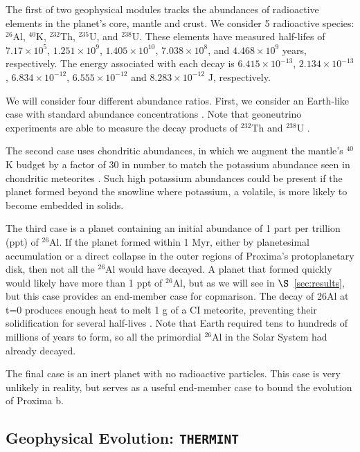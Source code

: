 \documentclass[preprint,12pt]{aastex}
\def\eg{{\it e.g.\ }}
\def\thermint{\texttt{\footnotesize{THERMINT}}\xspace}
\begin{document}
The first of two geophysical modules tracks the abundances of
radioactive elements in the planet's core, mantle and crust. We
consider 5 radioactive species: $^{26}$Al, $^{40}$K, $^{232}$Th,
$^{235}$U, and $^{238}$U. These elements have measured half-lifes of
$7.17 \times 10^5$, $1.251 \times 10^9$, $1.405 \times 10^{10}$,
$7.038 \times 10^8$, and $4.468 \times 10^9$ years, respectively. The
energy associated with each decay is $6.415 \times 10^{-13}$,
$2.134 \times 10^{-13}$, $6.834 \times 10^{-12}$,
$6.555 \times 10^{-12}$ and $8.283 \times 10^{-12}$ J, respectively.

We will consider four different abundance ratios. First, we consider an
Earth-like case with standard abundance concentrations
\citep[\eg][]{Korenaga03,Arevalo09,Huang13}. Note that geoneutrino
experiments are able to measure the decay products of $^{232}$Th and
$^{238}$U \citep{Raghavan98,Araki05,Dye10}.

The second case uses chondritic abundances, in which we augment the
mantle's $^{40}$K budget by a factor of 30 in number to match the
potassium abundance seen in chondritic meteorites
\citep{AndersGrevesse89,Arevalo09}. Such high potassium abundances could be
present if the planet formed beyond the snowline where potassium, a
volatile, is more likely to become embedded in solids.

The third case is a planet containing an initial abundance of 1 part
per trillion (ppt) of $^{26}$Al. If the planet formed within 1 Myr,
either by planetesimal accumulation or a direct collapse in the outer
regions of Proxima's protoplanetary disk, then not all the $^{26}$Al
would have decayed. A planet that formed quickly would likely have
more than 1 ppt of $^{26}$Al, but as we will see in
$\S$~\ref{sec:results}, but this case provides an end-member case for
copmarison. The decay of 26Al at t=0 produces enough heat to melt 1 g
of a CI meteorite, preventing their solidification for several
half-lives \citep{HeveySanders06}. Note that Earth required tens to
hundreds of millions of years to form, so all the primordial $^{26}$Al
in the Solar System had already decayed.

The final case is an inert planet with no radioactive particles. This
case is very unlikely in reality, but serves as a useful end-member
case to bound the evolution of Proxima b.

\subsection{Geophysical Evolution: \thermint}
\label{sec:models:thermint}
\end{document}
